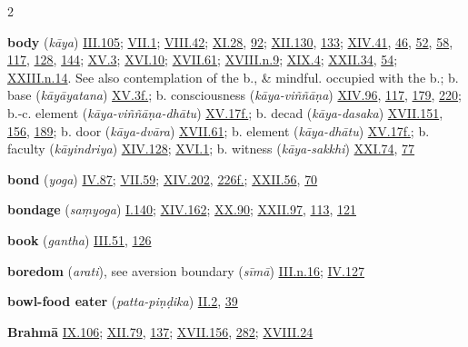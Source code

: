 \begin{multicols}{2}
\begin{vismHanging}
\par\textbf{body} (\emph{kāya}) \hyperlink{III.105}{III.105}{}; \hyperlink{VII.1}{VII.1}{}; \hyperlink{VIII.42}{VIII.42}{}; \hyperlink{XI.28}{XI.28}{}, \hyperlink{XI.92}{92}{}; \hyperlink{XII.130}{XII.130}{}, \hyperlink{XII.133}{133}{}; \hyperlink{XIV.41}{XIV.41}{}, \hyperlink{XIV.46}{46}{}, \hyperlink{XIV.52}{52}{}, \hyperlink{XIV.58}{58}{}, \hyperlink{XIV.117}{117}{}, \hyperlink{XIV.128}{128}{}, \hyperlink{XIV.144}{144}{}; \hyperlink{XV.3}{XV.3}{}; \hyperlink{XVI.10}{XVI.10}{}; \hyperlink{XVII.61}{XVII.61}{}; \hyperlink{XVIII.n9}{XVIII.n.9}{}; \hyperlink{XIX.4}{XIX.4}{}; \hyperlink{XXII.34}{XXII.34}{}, \hyperlink{XXII.54}{54}{}; \hyperlink{XXIII.n14}{XXIII.n.14}{}. See also contemplation of the b., \& mindful. occupied with the b.; b. base (\emph{kāyāyatana}) \hyperlink{XV.3}{XV.3f.}{}; b. consciousness (\emph{kāya-viññāṇa}) \hyperlink{XIV.96}{XIV.96}{}, \hyperlink{XIV.117}{117}{}, \hyperlink{XIV.179}{179}{}, \hyperlink{XIV.220}{220}{}; b.-c. element (\emph{kāya-viññāṇa-dhātu}) \hyperlink{XV.17}{XV.17f.}{}; b. decad (\emph{kāya-dasaka}) \hyperlink{XVII.151}{XVII.151}{}, \hyperlink{XVII.156}{156}{}, \hyperlink{XVII.189}{189}{}; b. door (\emph{kāya-dvāra}) \hyperlink{XVII.61}{XVII.61}{}; b. element (\emph{kāya-dhātu}) \hyperlink{XV.17}{XV.17f.}{}; b. faculty (\emph{kāyindriya}) \hyperlink{XIV.128}{XIV.128}{}; \hyperlink{XVI.1}{XVI.1}{}; b. witness (\emph{kāya-sakkhi}) \hyperlink{XXI.74}{XXI.74}{}, \hyperlink{XXI.77}{77}{}
\par\textbf{bond} (\emph{yoga}) \hyperlink{IV.87}{IV.87}{}; \hyperlink{VII.59}{VII.59}{}; \hyperlink{XIV.202}{XIV.202}{}, \hyperlink{XIV.226}{226f.}{}; \hyperlink{XXII.56}{XXII.56}{}, \hyperlink{XXII.70}{70}{}
\par\textbf{bondage} (\emph{saṃyoga}) \hyperlink{I.140}{I.140}{}; \hyperlink{XIV.162}{XIV.162}{}; \hyperlink{XX.90}{XX.90}{}; \hyperlink{XXII.97}{XXII.97}{}, \hyperlink{XXII.113}{113}{}, \hyperlink{XXII.121}{121}{}
\par\textbf{book} (\emph{gantha}) \hyperlink{III.51}{III.51}{}, \hyperlink{III.126}{126}{}
\par\textbf{boredom} (\emph{arati}), see aversion boundary (\emph{sīmā}) \hyperlink{III.n16}{III.n.16}{}; \hyperlink{IV.127}{IV.127}{}
\par\textbf{bowl-food eater} (\emph{patta-piṇḍika}) \hyperlink{II.2}{II.2}{}, \hyperlink{II.39}{39}{}
\par\textbf{Brahmā} \hyperlink{IX.106}{IX.106}{}; \hyperlink{XII.79}{XII.79}{}, \hyperlink{XII.137}{137}{}; \hyperlink{XVII.156}{XVII.156}{}, \hyperlink{XVII.282}{282}{}; \hyperlink{XVIII.24}{XVIII.24}{}

\end{vismHanging}
\end{multicols}
